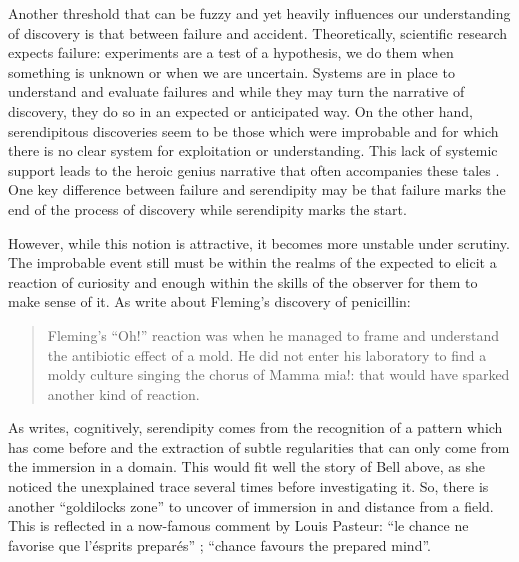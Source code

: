 \documentclass[authordate, empirical]{jote-new-article}
\begin{document}
	Another threshold that can be fuzzy and yet heavily influences our understanding of discovery is that between failure and accident. Theoretically, scientific research expects failure: experiments are a test of a hypothesis, we do them when something is unknown or when we are uncertain. Systems are in place to understand and evaluate failures and while they may turn the narrative of discovery, they do so in an expected or anticipated way. On the other hand, serendipitous discoveries seem to be those which were improbable and for which there is no clear system for exploitation or understanding. This lack of systemic support leads to the heroic genius narrative that often accompanies these tales \parencites{Copeland2018}. One key difference between failure and serendipity may be that failure marks the end of the process of discovery while serendipity marks the start.



	However, while this notion is attractive, it becomes more unstable under scrutiny. The improbable event still must be within the realms of the expected to elicit a reaction of curiosity and enough within the skills of the observer for them to make sense of it. As \textcites[][p. 5]{Arfini2018} write about Fleming's discovery of penicillin:



	\begin{quotation}
        Fleming's “Oh!” reaction was when he managed to frame and understand the antibiotic effect of a mold. He did not enter his laboratory to find a moldy culture singing the chorus of Mamma mia!: that would have sparked another kind of reaction.
    \end{quotation}


	As \textcites{Boden2004} writes, cognitively, serendipity comes from the recognition of a pattern which has come before and the extraction of subtle regularities that can only come from the immersion in a domain. This would fit well the story of Bell above, as she noticed the unexplained trace several times before investigating it. So, there is another “goldilocks zone” to uncover of immersion in and distance from a field. This is reflected in a now-famous comment by Louis Pasteur: “le chance ne favorise que l'ésprits preparés” \parencites{Pasteur1854}; “chance favours the prepared mind”.
\end{document}
